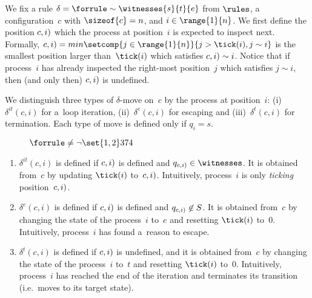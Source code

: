 We fix a rule $\delta = \forrule \sim \witnesses {s} {t} {e}$ from
$\rules$, a configuration~$c$ with $\sizeof{c}=n$, and
$i\in\range{1}{n}$.
% 
We first define the position $\next(c,i)$ which the process at
position~$i$ is expected to inspect next. Formally, $\next(c,i) =
min\setcomp{j\in\range{1}{n}}{j>\tick(i), j\sim i}$ is the smallest
position larger than~$\tick(i)$ which satisfies $\next(c,i)\sim i$.
% 
Notice that if process~$i$ has already inspected the right-most
position~$j$ which satisfies $j\sim i$, then (and only then)
$\next(c,i)$ is undefined.

We distinguish three types of $\delta$-move on~$c$ by the process at
position~$i$:
(i)~$\delta^{it}(c,i)$ for a~loop iteration, %
(ii)~$\delta^{e}(c,i)$ for escaping and %
(iii)~$\delta^{t}(c,i)$ for termination. 
% 
Each type of move is defined only if $q_i = s$.
%

\begingroup%
\setlength\intextsep{\the\medskipamount}
\begin{figure}[!b]%
  \centering
  \hfill%
  \hfill%
  \caption{$\forrule \neq {\neg\set{1,2}} 3 7 4$}
  \label{figure:non:atomic}
\end{figure}
\endgroup

\newpage
\begin{enumerate}[label={(\roman{*})}]%
\item %
  $\delta^{it}(c,i)$ is defined if $\next(c,i)$ is defined and
  $q_{\next(c,i)}\in\witnesses$. It is obtained from~$c$ by updating
  $\tick(i)$ to~$\next(c,i)$. Intuitively, process~$i$ is only
  \emph{ticking} position~$\next(c,i)$.
\item %
  $\delta^{e}(c,i)$ is defined if $\next(c,i)$ is defined and
  $q_{\next(c,i)}\not\in S$. It is obtained from~$c$ by changing the
  state of the process~$i$ to~$e$ and resetting $\tick(i)$
  to~$0$. Intuitively, process~$i$ has found a~reason to escape.
\item %
  $\delta^{t}(c,i)$ is defined if $\next(c,i)$ is undefined, and it is
  obtained from~$c$ by changing the state of the process~$i$ to~$t$
  and resetting $\tick(i)$ to~$0$. Intuitively, process~$i$ has
  reached the end of the iteration and terminates its transition
  (i.e.\ moves to its target state).
\end{enumerate}

